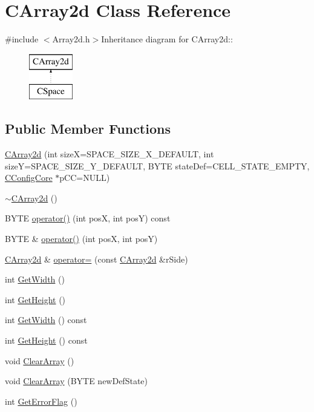 \hypertarget{classCArray2d}{
\section{CArray2d Class Reference}
\label{classCArray2d}
}


{\ttfamily \#include $<$Array2d.h$>$}Inheritance diagram for CArray2d::\begin{figure}[H]
\begin{center}
\leavevmode
\includegraphics[height=2cm]{classCArray2d}
\end{center}
\end{figure}
\subsection*{Public Member Functions}
\begin{DoxyCompactItemize}
\item 
\hyperlink{classCArray2d_a89adc38a3b0859b819fee52cc054f519}{CArray2d} (int sizeX=SPACE\_\-SIZE\_\-X\_\-DEFAULT, int sizeY=SPACE\_\-SIZE\_\-Y\_\-DEFAULT, BYTE stateDef=CELL\_\-STATE\_\-EMPTY, \hyperlink{classCConfigCore}{CConfigCore} $\ast$pCC=NULL)
\item 
\hyperlink{classCArray2d_a166233a87063ef3ae7d510c8f055df56}{$\sim$CArray2d} ()
\item 
BYTE \hyperlink{classCArray2d_a4d823e1efbdf408cf6960ccd9a40f651}{operator()} (int posX, int posY) const 
\item 
BYTE \& \hyperlink{classCArray2d_aa2e06bfd438eff2979d51c87b561343b}{operator()} (int posX, int posY)
\item 
\hyperlink{classCArray2d}{CArray2d} \& \hyperlink{classCArray2d_aed5c505b790e7b4ea06bf46ef67065f8}{operator=} (const \hyperlink{classCArray2d}{CArray2d} \&rSide)
\item 
int \hyperlink{classCArray2d_a7cfeb98b3112d1e147464a7ec2374579}{GetWidth} ()
\item 
int \hyperlink{classCArray2d_ae019e1beca716a4ea7d368e342fe23a1}{GetHeight} ()
\item 
int \hyperlink{classCArray2d_a021336ae61eb605e5d534722259d3c62}{GetWidth} () const 
\item 
int \hyperlink{classCArray2d_afbfa71015584fcb399c6fde2fa9be1b0}{GetHeight} () const 
\item 
void \hyperlink{classCArray2d_a3b4fc6d5c1536af5e6aead66ee7259eb}{ClearArray} ()
\item 
void \hyperlink{classCArray2d_a7171786b38896bf4bc52261daae3dde0}{ClearArray} (BYTE newDefState)
\item 
int \hyperlink{classCArray2d_afee234adb0190a1d8f3841f75a295e26}{GetErrorFlag} ()
\end{DoxyCompactItemize}
